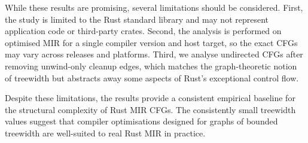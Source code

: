 While these results are promising, several limitations should be considered.
First, the study is limited to the Rust standard library and may not represent application code or third-party crates.
Second, the analysis is performed on optimised MIR for a single compiler version and host target, so the exact CFGs may vary across releases and platforms.
Third, we analyse undirected CFGs after removing unwind-only cleanup edges, which matches the graph-theoretic notion of treewidth but abstracts away some aspects of Rust's exceptional control flow.

Despite these limitations, the results provide a consistent empirical baseline for the structural complexity of Rust MIR CFGs.
The consistently small treewidth values suggest that compiler optimisations designed for graphs of bounded treewidth are well-suited to real Rust MIR in practice.
